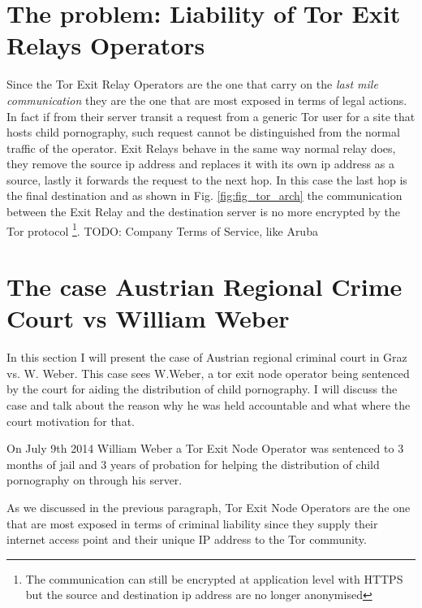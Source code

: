 \documentclass[runningheads,a4paper]{llncs}
\begin{document}
\section{The problem: Liability of Tor Exit Relays Operators}
Since the Tor Exit Relay Operators are the one that carry on the \textit{last mile communication} they are the one that are most exposed in terms of legal actions. In fact if from their server transit a request from a generic Tor user for a site that hosts child pornography, such request cannot be distinguished from the normal traffic of the operator. 
Exit Relays behave in the same way normal relay does, they remove the source ip address and replaces it with its own ip address as a source, lastly it forwards the request to the next hop. In this case the last hop is the final destination and as shown in Fig. \ref{fig:fig_tor_arch} the communication between the Exit Relay and the destination server is no more encrypted by the Tor protocol \footnote{The communication can still be encrypted at application level with HTTPS but the source and destination ip address are no longer anonymised}. 
TODO: Company Terms of Service, like Aruba

\section{The case Austrian Regional Crime Court vs William Weber}
In this section I will present the case of Austrian regional criminal court in Graz vs. W. Weber. This case sees W.Weber, a tor exit node operator being sentenced by the court for aiding the distribution of child pornography. I will discuss the case and talk about the reason why he was held accountable and what where the court motivation for that.

On July 9th 2014 William Weber a Tor Exit Node Operator was sentenced to 3 months of jail and 3 years of probation for helping the distribution of child pornography on through his server.

As we discussed in the previous paragraph, Tor Exit Node Operators are the one that are most exposed in terms of criminal liability since they supply their internet access point and their unique IP address to the Tor community.
\end{document}
